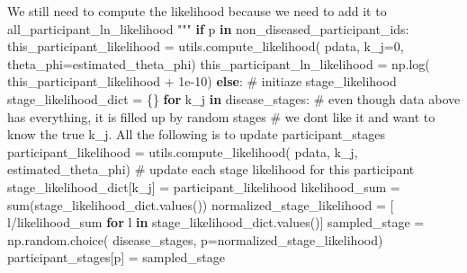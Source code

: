 \documentclass[
  letterpaper,
  DIV=11,
  numbers=noendperiod]{scrreprt}
\newenvironment{Shaded}{\begin{snugshade}}{\end{snugshade}}
\newcommand{\BuiltInTok}[1]{\textcolor[rgb]{0.00,0.23,0.31}{#1}}
\newcommand{\CommentTok}[1]{\textcolor[rgb]{0.37,0.37,0.37}{#1}}
\newcommand{\ControlFlowTok}[1]{\textcolor[rgb]{0.00,0.23,0.31}{\textbf{#1}}}
\newcommand{\DecValTok}[1]{\textcolor[rgb]{0.68,0.00,0.00}{#1}}
\newcommand{\FloatTok}[1]{\textcolor[rgb]{0.68,0.00,0.00}{#1}}
\newcommand{\KeywordTok}[1]{\textcolor[rgb]{0.00,0.23,0.31}{\textbf{#1}}}
\newcommand{\NormalTok}[1]{\textcolor[rgb]{0.00,0.23,0.31}{#1}}
\newcommand{\OperatorTok}[1]{\textcolor[rgb]{0.37,0.37,0.37}{#1}}
\begin{document}
\begin{Shaded}
\begin{Highlighting}[]
\CommentTok{        We still need to compute the likelihood because we need to add it to all\_participant\_ln\_likelihood}
\CommentTok{        """}
        \ControlFlowTok{if}\NormalTok{ p }\KeywordTok{in}\NormalTok{ non\_diseased\_participant\_ids:}
\NormalTok{            this\_participant\_likelihood }\OperatorTok{=}\NormalTok{ utils.compute\_likelihood(}
\NormalTok{                pdata, k\_j}\OperatorTok{=}\DecValTok{0}\NormalTok{, theta\_phi}\OperatorTok{=}\NormalTok{estimated\_theta\_phi)}
\NormalTok{            this\_participant\_ln\_likelihood }\OperatorTok{=}\NormalTok{ np.log(}
\NormalTok{                this\_participant\_likelihood }\OperatorTok{+} \FloatTok{1e{-}10}\NormalTok{)}
        \ControlFlowTok{else}\NormalTok{:}
            \CommentTok{\# initiaze stage\_likelihood}
\NormalTok{            stage\_likelihood\_dict }\OperatorTok{=}\NormalTok{ \{\}}
            \ControlFlowTok{for}\NormalTok{ k\_j }\KeywordTok{in}\NormalTok{ disease\_stages:}
                \CommentTok{\# even though data above has everything, it is filled up by random stages}
                \CommentTok{\# we don\textquotesingle{}t like it and want to know the true k\_j. All the following is to update participant\_stages}
\NormalTok{                participant\_likelihood }\OperatorTok{=}\NormalTok{ utils.compute\_likelihood(}
\NormalTok{                    pdata, k\_j, estimated\_theta\_phi)}
                \CommentTok{\# update each stage likelihood for this participant}
\NormalTok{                stage\_likelihood\_dict[k\_j] }\OperatorTok{=}\NormalTok{ participant\_likelihood}
\NormalTok{            likelihood\_sum }\OperatorTok{=} \BuiltInTok{sum}\NormalTok{(stage\_likelihood\_dict.values())}
\NormalTok{            normalized\_stage\_likelihood }\OperatorTok{=}\NormalTok{ [}
\NormalTok{                l}\OperatorTok{/}\NormalTok{likelihood\_sum }\ControlFlowTok{for}\NormalTok{ l }\KeywordTok{in}\NormalTok{ stage\_likelihood\_dict.values()]}
\NormalTok{            sampled\_stage }\OperatorTok{=}\NormalTok{ np.random.choice(}
\NormalTok{                disease\_stages, p}\OperatorTok{=}\NormalTok{normalized\_stage\_likelihood)}
\NormalTok{            participant\_stages[p] }\OperatorTok{=}\NormalTok{ sampled\_stage}


\end{Highlighting}
\end{Shaded}
\end{document}
